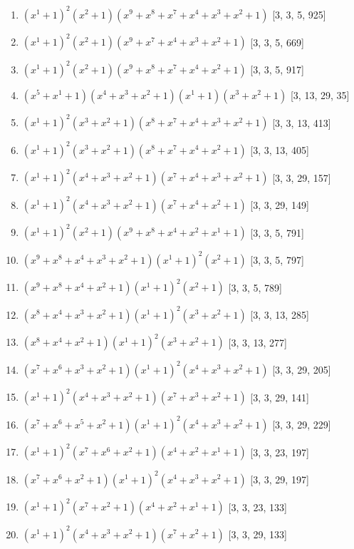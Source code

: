 \documentclass[10pt,twocolumn]{article}
\begin{document}
\begin{enumerate}
\item $(x^{1} + 1)^{2}(x^{2} + 1)(x^{9} + x^{8} + x^{7} + x^{4} + x^{3} + x^{2} + 1)$  [3, 3, 5, 925]
\item $(x^{1} + 1)^{2}(x^{2} + 1)(x^{9} + x^{7} + x^{4} + x^{3} + x^{2} + 1)$  [3, 3, 5, 669]
\item $(x^{1} + 1)^{2}(x^{2} + 1)(x^{9} + x^{8} + x^{7} + x^{4} + x^{2} + 1)$  [3, 3, 5, 917]
\item $(x^{5} + x^{1} + 1)(x^{4} + x^{3} + x^{2} + 1)(x^{1} + 1)(x^{3} + x^{2} + 1)$  [3, 13, 29, 35]
\item $(x^{1} + 1)^{2}(x^{3} + x^{2} + 1)(x^{8} + x^{7} + x^{4} + x^{3} + x^{2} + 1)$  [3, 3, 13, 413]
\item $(x^{1} + 1)^{2}(x^{3} + x^{2} + 1)(x^{8} + x^{7} + x^{4} + x^{2} + 1)$  [3, 3, 13, 405]
\item $(x^{1} + 1)^{2}(x^{4} + x^{3} + x^{2} + 1)(x^{7} + x^{4} + x^{3} + x^{2} + 1)$  [3, 3, 29, 157]
\item $(x^{1} + 1)^{2}(x^{4} + x^{3} + x^{2} + 1)(x^{7} + x^{4} + x^{2} + 1)$  [3, 3, 29, 149]
\item $(x^{1} + 1)^{2}(x^{2} + 1)(x^{9} + x^{8} + x^{4} + x^{2} + x^{1} + 1)$  [3, 3, 5, 791]
\item $(x^{9} + x^{8} + x^{4} + x^{3} + x^{2} + 1)(x^{1} + 1)^{2}(x^{2} + 1)$  [3, 3, 5, 797]
\item $(x^{9} + x^{8} + x^{4} + x^{2} + 1)(x^{1} + 1)^{2}(x^{2} + 1)$  [3, 3, 5, 789]
\item $(x^{8} + x^{4} + x^{3} + x^{2} + 1)(x^{1} + 1)^{2}(x^{3} + x^{2} + 1)$  [3, 3, 13, 285]
\item $(x^{8} + x^{4} + x^{2} + 1)(x^{1} + 1)^{2}(x^{3} + x^{2} + 1)$  [3, 3, 13, 277]
\item $(x^{7} + x^{6} + x^{3} + x^{2} + 1)(x^{1} + 1)^{2}(x^{4} + x^{3} + x^{2} + 1)$  [3, 3, 29, 205]
\item $(x^{1} + 1)^{2}(x^{4} + x^{3} + x^{2} + 1)(x^{7} + x^{3} + x^{2} + 1)$  [3, 3, 29, 141]
\item $(x^{7} + x^{6} + x^{5} + x^{2} + 1)(x^{1} + 1)^{2}(x^{4} + x^{3} + x^{2} + 1)$  [3, 3, 29, 229]
\item $(x^{1} + 1)^{2}(x^{7} + x^{6} + x^{2} + 1)(x^{4} + x^{2} + x^{1} + 1)$  [3, 3, 23, 197]
\item $(x^{7} + x^{6} + x^{2} + 1)(x^{1} + 1)^{2}(x^{4} + x^{3} + x^{2} + 1)$  [3, 3, 29, 197]
\item $(x^{1} + 1)^{2}(x^{7} + x^{2} + 1)(x^{4} + x^{2} + x^{1} + 1)$  [3, 3, 23, 133]
\item $(x^{1} + 1)^{2}(x^{4} + x^{3} + x^{2} + 1)(x^{7} + x^{2} + 1)$  [3, 3, 29, 133]

\end{enumerate}
\end{document}
